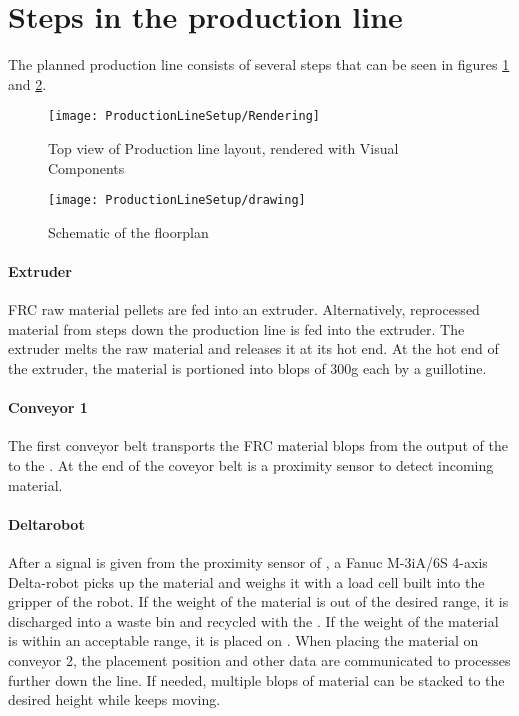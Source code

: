 \section{Steps in the production line}
The planned production line consists of several steps that can be seen in figures \ref{fig:ProdLineVisComp} and \ref{fig:ProdLineSchem}.

\begin{figure}[H]
	\texttt{[image: ProductionLineSetup/Rendering]}
	\caption{Top view of Production line layout, rendered with Visual Components \cite{AliyaThesis}}
	\label{fig:ProdLineVisComp}
\end{figure}

\begin{figure}[H]
	\texttt{[image: ProductionLineSetup/drawing]}
	\caption{Schematic of the floorplan \cite{AliyaThesis}}
	\label{fig:ProdLineSchem}
\end{figure}

\paragraph{Extruder} \label{sec:extruder}
\ac{FRC} raw material pellets are fed into an extruder. 
Alternatively, reprocessed material from steps down the production line is fed into the extruder.
The extruder melts the raw material and releases it at its hot end. 
At the hot end of the extruder, the material is portioned into blops of 300g each by a guillotine.

\paragraph{Conveyor 1} \label{sec:conveyor1}
The first conveyor belt transports the \ac{FRC} material blops from the output of the  to the . At the end of the coveyor belt is a proximity sensor to detect incoming material.

\paragraph{Deltarobot} \label{sec:Deltarobot}
After a signal is given from the proximity sensor of , a  Fanuc M-3iA/6S 4-axis Delta-robot picks up the material and weighs it with a load cell built into the gripper of the robot. 
If the weight of the material is out of the desired range, it is discharged into a waste bin and recycled with the .
If the weight of the material is within an acceptable range, it is placed on .
When placing the material on conveyor 2, the placement position and other data are communicated to processes further down the line.
If needed, multiple blops of material can be stacked to the desired height while  keeps moving.


